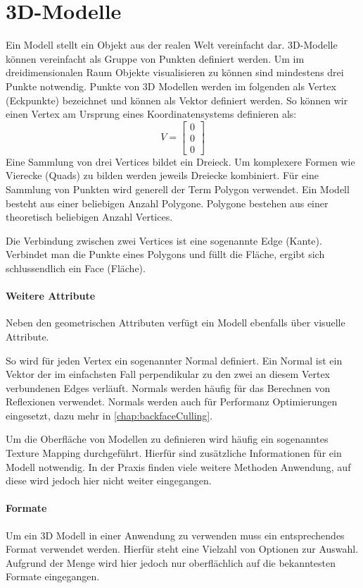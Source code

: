 \section{3D-Modelle}
Ein Modell stellt ein Objekt aus der realen Welt vereinfacht dar.
3D-Modelle können vereinfacht als Gruppe von Punkten definiert werden.
Um im dreidimensionalen Raum Objekte visualisieren zu können sind mindestens drei Punkte notwendig.
Punkte von 3D Modellen werden im folgenden als Vertex (Eckpunkte) bezeichnet und können als Vektor definiert werden.
So können wir einen Vertex am Ursprung eines Koordinatensystems definieren als:
$$ V =
\begin{bmatrix}
  0 \\
  0 \\
  0
\end{bmatrix}
$$
Eine Sammlung von drei Vertices bildet ein Dreieck. Um komplexere Formen wie Vierecke (Quads) zu bilden werden jeweils Dreiecke kombiniert.
Für eine Sammlung von Punkten wird generell der Term Polygon verwendet.
Ein Modell besteht aus einer beliebigen Anzahl Polygone.
Polygone bestehen aus einer theoretisch beliebigen Anzahl Vertices.

Die Verbindung zwischen zwei Vertices ist eine sogenannte Edge (Kante).
Verbindet man die Punkte eines Polygons und füllt die Fläche, ergibt sich schlussendlich ein Face (Fläche).

\paragraph{Weitere Attribute}
Neben den geometrischen Attributen verfügt ein Modell ebenfalls über visuelle Attribute.

So wird für jeden Vertex ein sogenannter Normal definiert. Ein Normal ist ein Vektor der im einfachsten Fall perpendikular zu den zwei an diesem Vertex verbundenen Edges verläuft. Normals werden häufig für das Berechnen von Reflexionen verwendet.
Normals werden auch für Performanz Optimierungen eingesetzt, dazu mehr in \autoref{chap:backfaceCulling}.

Um die Oberfläche von Modellen zu definieren wird häufig ein sogenanntes Texture Mapping durchgeführt. Hierfür sind zusätzliche Informationen für ein Modell notwendig. In der Praxis finden viele weitere Methoden Anwendung, auf diese wird jedoch hier nicht weiter eingegangen.

\paragraph{Formate}
Um ein 3D Modell in einer Anwendung zu verwenden muss ein entsprechendes Format verwendet werden. Hierfür steht eine Vielzahl von Optionen zur Auswahl. Aufgrund der Menge wird hier jedoch nur oberflächlich auf die bekanntesten Formate eingegangen.

